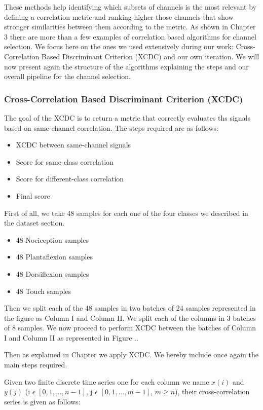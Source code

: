 \documentclass{Configuration_Files/PoliMi3i_thesis}
\begin{document}
These methods help identifying which subsets of channels is the most relevant by defining a correlation metric and ranking higher those channels that show stronger similarities between them according to the metric.
As shown in Chapter 3 there are more than a few examples of correlation based algorithms for channel selection.
We focus here on the ones we used extensively during our work: Cross-Correlation Based Discriminant Criterion (XCDC) and our own iteration.
We will now present again the structure of the algorithms explaining the steps and our overall pipeline for the channel selection.

\subsubsection{Cross-Correlation Based Discriminant
Criterion (XCDC)}

The goal of the XCDC is to return a metric that correctly evaluates ths signals based on same-channel correlation.
The steps required are as follows:
\begin{itemize}
	\item XCDC between same-channel signals
	\item Score for same-class correlation
	\item Score for different-class correlation
	\item Final score
\end{itemize}

First of all, we take 48 samples for each one of the four classes we described in the dataset section.

\begin{itemize}
	\item 48 Nociception samples
	\item 48 Plantaflexion samples
	\item 48 Dorsiflexion samples
	\item 48 Touch samples
\end{itemize}

Then we split each of the 48 samples in two batches of 24 samples represented in the figure as Column I and Column II.
We split each of the columns in 3 batches of 8 samples.
We now proceed to perform XCDC between the batches of Column I and Column II as represented in Figure ..

Then as explained in Chapter we apply XCDC.
We hereby include once again the main steps required.

Given two finite discrete time series one for each column we name $x(i)$ and $y(j)$
(i $\epsilon$ $[0, 1, . . . , n - 1]$, j $\epsilon$ $[0, 1, . . . , m - 1]$, $m \geq n$),
their cross-correlation series is given as follows:
\end{document}
